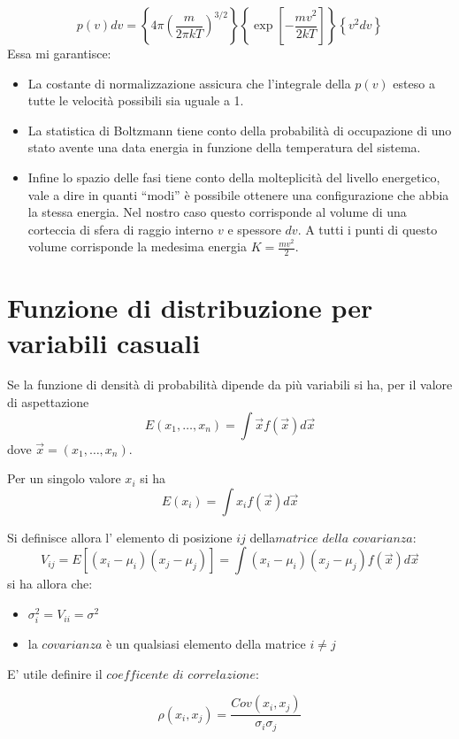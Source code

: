 \documentclass{article}
\theoremstyle{remark}
\begin{document}
\begin{itemize}
    
    \[
    p(v) dv = \left\{ 4\pi \left( \frac{m}{2\pi kT} \right)^{3/2} \right\} \left\{ \exp \left[ -\frac{mv^2}{2kT} \right] \right\} \left\{ v^2 dv \right\}
    \]
Essa mi garantisce:
\begin{itemize}
    \item La costante di normalizzazione assicura che l'integrale della \( p(v) \) esteso a tutte le velocità possibili sia uguale a 1.
    
    \item La statistica di Boltzmann tiene conto della probabilità di occupazione di uno stato avente una data energia in funzione della temperatura del sistema.
    
    \item Infine lo spazio delle fasi tiene conto della molteplicità del livello energetico, vale a dire in quanti ``modi'' è possibile ottenere una configurazione che abbia la stessa energia. Nel nostro caso questo corrisponde al volume di una corteccia di sfera di raggio interno \( v \) e spessore \( dv \). A tutti i punti di questo volume corrisponde la medesima energia \( K = \frac{mv^2}{2} \).
\end{itemize}


\end{itemize}


\section{Funzione di distribuzione per variabili casuali}
Se la funzione di densità di probabilità dipende da più variabili si ha, per il valore di aspettazione
\[
E(x_1, \ldots, x_n) = \int \vec {x}f(\vec{x})d\vec{x}
\]
dove $\vec{x}=(x_1, \ldots, x_n)$.

Per un singolo valore $x_i$ si ha
\[
E(x_i) = \int x_i f(\vec{x}) d\vec{x}
\]

Si definisce allora l' elemento di posizione  $ij$ della$matrice$ $della$ $covarianza$:
\[
V_{ij}=E[(x_i-\mu_i)(x_j-\mu_j)]=\int (x_i-\mu_i)(x_j-\mu_j)f(\vec{x}) d\vec{x}
\]
si ha allora che:
\begin{itemize}
    \item $\sigma_i^2=V_{ii}=\sigma^2$
    \item la $covarianza$ è un qualsiasi elemento della matrice $i\neq j$
\end{itemize}
E' utile definire il $coefficente$ $di$ $correlazione$:

\[\rho(x_i,x_j)=\frac{Cov(x_i,x_j)}{\sigma_i \sigma_j}\]
\end{document}
